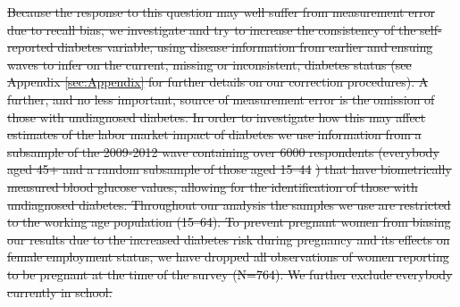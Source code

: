 \documentclass[12pt,english]{article}
\providecommand{\DIFdeltex}[1]{{\protect\color{red}\sout{#1}}}                      %
\providecommand{\DIFdelbegin}{} %
\providecommand{\DIFdel}[1]{\texorpdfstring{\DIFdeltex{#1}}{}} %
\begin{document}
\DIFdelbegin \DIFdel{Because the response to this question may well suffer from measurement error due to recall bias, we investigate and try to increase the consistency of the self-reported diabetes variable, using disease information from earlier and ensuing waves to infer on the current, missing or inconsistent, diabetes status (see Appendix \ref{sec:Appendix} for further details on our correction procedures). A further, and no less important, source of measurement error is the omission of those with undiagnosed diabetes. In order to investigate how this may affect estimates of the labor market impact of diabetes we use information from a subsample of the 2009-2012 wave containing over 6000 respondents (everybody aged 45+  and a random subsample of those aged 15--44 }%
\DIFdel{) that have biometrically measured blood glucose values, allowing for the identification of those with undiagnosed diabetes. 
Throughout our analysis the samples we use are restricted to the working age population (15--64). To prevent pregnant women from biasing our results due to the increased diabetes risk during pregnancy and its effects on female employment status, we have dropped all observations of women reporting to be pregnant at the time of the survey (N=764). We further exclude everybody currently in school.
}%
\end{document}
